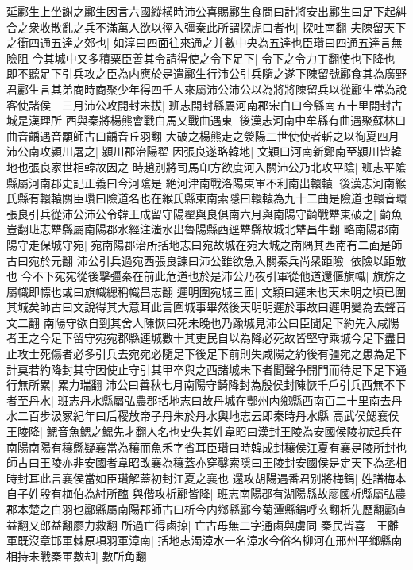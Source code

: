 延酈生上坐謝之酈生因言六國縱横時沛公喜賜酈生食問曰計將安出酈生曰足下起糾合之衆收散亂之兵不滿萬人欲以徑入彊秦此所謂探虎口者也|{
	探吐南翻}
夫陳留天下之衝四通五達之郊也|{
	如淳曰四面往來通之并數中央為五達也臣瓚曰四通五達言無險阻}
今其城中又多積粟臣善其令請得使之令下足下|{
	令下之令力丁翻使也下降也}
即不聽足下引兵攻之臣為内應於是遣酈生行沛公引兵隨之遂下陳留號酈食其為廣野君酈生言其弟商時商聚少年得四千人來屬沛公沛公以為將將陳留兵以從酈生常為說客使諸侯　三月沛公攻開封未拔|{
	班志開封縣屬河南郡宋白曰今縣南五十里開封古城是漢理所}
西與秦將楊熊會戰白馬又戰曲遇東|{
	後漢志河南中牟縣有曲遇聚蘇林曰曲音齲遇音顒師古曰齲音丘羽翻}
大破之楊熊走之滎陽二世使使者斬之以徇夏四月沛公南攻潁川屠之|{
	潁川郡治陽翟}
因張良遂略韓地|{
	文穎曰河南新鄭南至潁川皆韓地也張良家世相韓故因之}
時趙别將司馬卬方欲度河入關沛公乃北攻平隂|{
	班志平隂縣屬河南郡史記正義曰今河隂是}
絶河津南戰洛陽東軍不利南出轘轅|{
	後漢志河南緱氏縣有轘轅關臣瓚曰險道名也在緱氏縣東南索隱曰轘轅為九十二曲是險道也轘音環}
張良引兵從沛公沛公令韓王成留守陽翟與良俱南六月與南陽守齮戰犨東破之|{
	齮魚豈翻班志犨縣屬南陽郡水經注滍水出魯陽縣西逕犨縣故城北犨昌牛翻}
略南陽郡南陽守走保城守宛|{
	宛南陽郡治所括地志曰宛故城在宛大城之南隅其西南有二面是師古曰宛於元翻}
沛公引兵過宛西張良諫曰沛公雖欲急入關秦兵尚衆距險|{
	依險以距敵也}
今不下宛宛從後擊彊秦在前此危道也於是沛公乃夜引軍從他道還偃旗幟|{
	旗旂之屬幟即幖也或曰旗幟總稱幟昌志翻}
遲明圍宛城三匝|{
	文穎曰遲未也天未明之頃已圍其城矣師古曰文說得其大意耳此言圍城事畢然後天明明遲於事故曰遲明變為去聲音文二翻}
南陽守欲自剄其舍人陳恢曰死未晚也乃踰城見沛公曰臣聞足下約先入咸陽者王之今足下留守宛宛郡縣連城數十其吏民自以為降必死故皆堅守乘城今足下盡日止攻士死傷者必多引兵去宛宛必隨足下後足下前則失咸陽之約後有彊宛之患為足下計莫若約降封其守因使止守引其甲卒與之西諸城未下者聞聲争開門而待足下足下通行無所累|{
	累力瑞翻}
沛公曰善秋七月南陽守齮降封為殷侯封陳恢千戶引兵西無不下者至丹水|{
	班志丹水縣屬弘農郡括地志曰故丹城在酆州内鄉縣西南百二十里南去丹水二百步汲冢紀年曰后稷放帝子丹朱於丹水輿地志云即秦時丹水縣}
高武侯鰓襄侯王陵降|{
	鰓音魚鰓之鰓先才翻人名也史失其姓韋昭曰漢封王陵為安國侯陵初起兵在南陽南陽有穰縣疑襄當為穰而魚禾字省耳臣瓚曰時韓成封穰侯江夏有襄是陵所封也師古曰王陵亦非安國者韋昭改襄為穰蓋亦穿鑿索隱曰王陵封安國侯是定天下為丞相時封耳此言襄侯當如臣瓚解蓋初封江夏之襄也}
還攻胡陽遇番君别將梅鋗|{
	姓譜梅本自子姓殷有梅伯為紂所醢}
與偕攻析酈皆降|{
	班志南陽郡有湖陽縣故廖國析縣屬弘農郡本楚之白羽也酈縣屬南陽郡師古曰析今内鄉縣酈今菊潭縣鋗呼玄翻析先歷翻酈直益翻又郎益翻廖力救翻}
所過亡得鹵掠|{
	亡古毋無二字通鹵與虜同}
秦民皆喜　王離軍既沒章邯軍棘原項羽軍漳南|{
	括地志濁漳水一名漳水今俗名柳河在邢州平鄉縣南}
相持未戰秦軍數却|{
	數所角翻}
